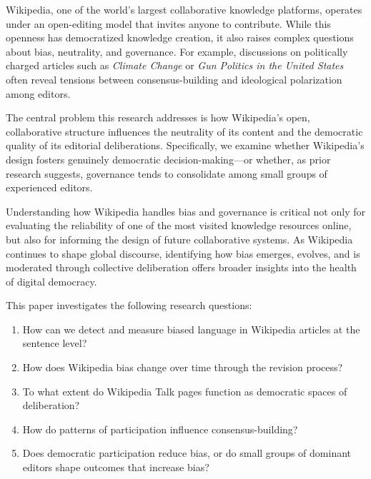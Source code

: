 
Wikipedia, one of the world’s largest collaborative knowledge platforms, operates under an open-editing model that invites anyone to contribute. While this openness has democratized knowledge creation, it also raises complex questions about bias, neutrality, and governance. For example, discussions on politically charged articles such as \textit{Climate Change} or \textit{Gun Politics in the United States} often reveal tensions between consensus-building and ideological polarization among editors.

The central problem this research addresses is how Wikipedia’s open, collaborative structure influences the neutrality of its content and the democratic quality of its editorial deliberations. Specifically, we examine whether Wikipedia’s design fosters genuinely democratic decision-making—or whether, as prior research suggests, governance tends to consolidate among small groups of experienced editors.

Understanding how Wikipedia handles bias and governance is critical not only for evaluating the reliability of one of the most visited knowledge resources online, but also for informing the design of future collaborative systems. As Wikipedia continues to shape global discourse, identifying how bias emerges, evolves, and is moderated through collective deliberation offers broader insights into the health of digital democracy.

This paper investigates the following research questions:
\begin{enumerate}
    \item How can we detect and measure biased language in Wikipedia articles at the sentence level?
    \item How does Wikipedia bias change over time through the revision process?
    \item To what extent do Wikipedia Talk pages function as democratic spaces of deliberation?
    \item How do patterns of participation influence consensus-building?
    \item Does democratic participation reduce bias, or do small groups of dominant editors shape outcomes that increase bias?
\end{enumerate}


